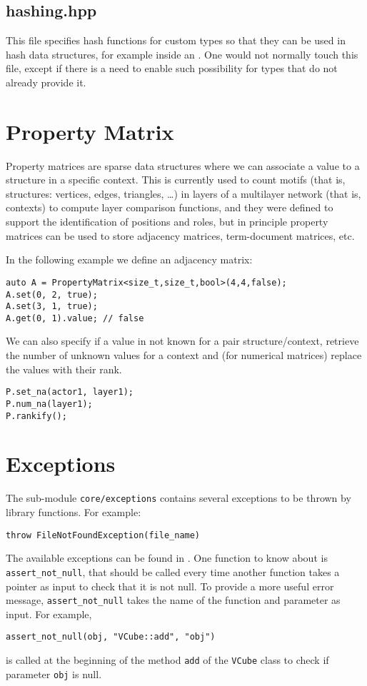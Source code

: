 \subsection{hashing.hpp}

This file specifies hash functions for custom types so that they can be used in hash data structures, for example inside an . One would not normally touch this file, except if there is a need to enable such possibility for types that do not already provide it.

\section{Property Matrix}

Property matrices are sparse data structures where we can associate a value to a structure in a specific context. This is currently used to count motifs (that is, structures: vertices, edges, triangles, \dots) in layers of a multilayer network (that is, contexts) to compute layer comparison functions, and they were defined to support the identification of positions and roles, but in principle property matrices can be used to store adjacency matrices, term-document matrices, etc.

In the following example we define an adjacency matrix:
\begin{lstlisting}[style=c++]
auto A = PropertyMatrix<size_t,size_t,bool>(4,4,false);
A.set(0, 2, true);
A.set(3, 1, true);
A.get(0, 1).value; // false
\end{lstlisting}

We can also specify if a value in not known for a pair structure/context, retrieve the number of unknown values for a context and (for numerical matrices) replace the values with their rank.
\begin{lstlisting}[style=c++]
P.set_na(actor1, layer1);
P.num_na(layer1);
P.rankify();
\end{lstlisting}

\section{Exceptions}

The sub-module \texttt{core/exceptions} contains several exceptions to be thrown by library functions. For example:
\begin{lstlisting}[style=c++]
throw FileNotFoundException(file_name)
\end{lstlisting}
The available exceptions can be found in . One function to know about is \texttt{assert\_not\_null}, that should be called every time another function takes a pointer as input to check that it is not null. To provide a more useful
error message, \texttt{assert\_not\_null} takes the name of the function and parameter as input. For example,
\begin{lstlisting}[style=c++]
assert_not_null(obj, "VCube::add", "obj")
\end{lstlisting}
is called at the beginning of the method \texttt{add} of the \texttt{VCube} class to check if parameter \texttt{obj} is null.

